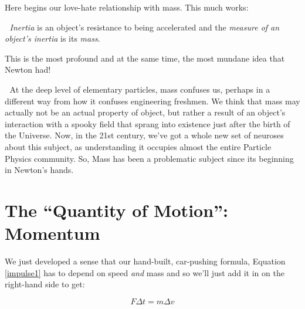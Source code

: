 \documentclass[
  letterpaper,
  DIV=11,
  numbers=noendperiod,
  oneside]{scrreprt}
\begin{document}
Here begins our love-hate relationship with mass. This much works:

\begin{tcolorbox}[enhanced jigsaw, colbacktitle=quarto-callout-important-color!10!white, rightrule=.15mm, toptitle=1mm, arc=.35mm, breakable, left=2mm, title={Important}, colframe=quarto-callout-important-color-frame, bottomrule=.15mm, colback=white, titlerule=0mm, leftrule=.75mm, toprule=.15mm, coltitle=black, opacityback=0, opacitybacktitle=0.6, bottomtitle=1mm]

🫵 \emph{Inertia} is an object's resistance to being accelerated and the
\emph{measure of an object's inertia} is its \emph{mass}.

\end{tcolorbox}

This is the most profound and at the same time, the most mundane idea
that Newton had!

\begin{tcolorbox}[enhanced jigsaw, colbacktitle=quarto-callout-tip-color!10!white, rightrule=.15mm, toptitle=1mm, arc=.35mm, breakable, left=2mm, title={Tip}, colframe=quarto-callout-tip-color-frame, bottomrule=.15mm, colback=white, titlerule=0mm, leftrule=.75mm, toprule=.15mm, coltitle=black, opacityback=0, opacitybacktitle=0.6, bottomtitle=1mm]

🔐 At the deep level of elementary particles, mass confuses us, perhaps
in a different way from how it confuses engineering freshmen. We think
that mass may actually not be an actual property of object, but rather a
result of an object's interaction with a spooky field that sprang into
existence just after the birth of the Universe. Now, in the 21st
century, we've got a whole new set of neuroses about this subject, as
understanding it occupies almost the entire Particle Physics community.
So, Mass has been a problematic subject since its beginning in Newton's
hands.

\end{tcolorbox}

\section{The ``Quantity of Motion'': Momentum}\label{sec-mechmomentum}

We just developed a sense that our hand-built, car-pushing formula,
Equation \ref{impulse1} has to depend on speed \emph{and} mass and so
we'll just add it in on the right-hand side to get:

\[
\begin{equation}
F\Delta t = m\Delta v  \label{impulse2}
\end{equation}
\]
\end{document}
